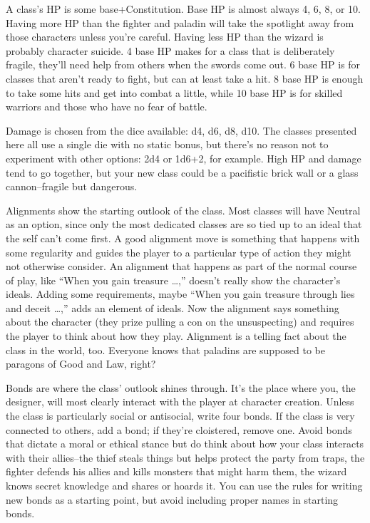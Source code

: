 A class's HP is some base+Constitution. Base HP is almost always 4, 6, 8, or 10. Having more HP than the fighter and paladin will take the spotlight away from those characters unless you're careful. Having less HP than the wizard is probably character suicide. 4 base HP makes for a class that is deliberately fragile, they'll need help from others when the swords come out. 6 base HP is for classes that aren't ready to fight, but can at least take a hit. 8 base HP is enough to take some hits and get into combat a little, while 10 base HP is for skilled warriors and those who have no fear of battle.


Damage is chosen from the dice available: d4, d6, d8, d10. The classes presented here all use a single die with no static bonus, but there's no reason not to experiment with other options: 2d4 or 1d6+2, for example. High HP and damage tend to go together, but your new class could be a pacifistic brick wall or a glass cannon--fragile but dangerous.


Alignments show the starting outlook of the class. Most classes will have Neutral as an option, since only the most dedicated classes are so tied up to an ideal that the self can't come first. A good alignment move is something that happens with some regularity and guides the player to a particular type of action they might not otherwise consider. An alignment that happens as part of the normal course of play, like ``When you gain treasure \ldots ,'' doesn't really show the character's ideals. Adding some requirements, maybe ``When you gain treasure through lies and deceit \ldots ,'' adds an element of ideals. Now the alignment says something about the character (they prize pulling a con on the unsuspecting) and requires the player to think about how they play. Alignment is a telling fact about the class in the world, too. Everyone knows that paladins are supposed to be paragons of Good and Law, right?


Bonds are where the class' outlook shines through. It's the place where you, the designer, will most clearly interact with the player at character creation. Unless the class is particularly social or antisocial, write four bonds. If the class is very connected to others, add a bond; if they're cloistered, remove one. Avoid bonds that dictate a moral or ethical stance but do think about how your class interacts with their allies--the thief steals things but helps protect the party from traps, the fighter defends his allies and kills monsters that might harm them, the wizard knows secret knowledge and shares or hoards it. You can use the rules for writing new bonds as a starting point, but avoid including proper names in starting bonds.



